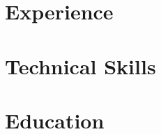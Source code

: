 \newcommand{\resumeSubSubheading}[2]{
    \item
    \begin{tabular*}{0.97\textwidth}{l@{\extracolsep{\fill}}r}
      \textit{\small#1} & \textit{\small #2} \\
    \end{tabular*}\vspace{-7pt}
}

\newcommand{\resumeProjectHeading}[2]{
    \item
    \begin{tabular*}{0.97\textwidth}{l@{\extracolsep{\fill}}r}
      \small#1 & #2 \\
    \end{tabular*}\vspace{-7pt}
}

\newcommand{\resumeSubItem}[1]{\resumeItem{#1}\vspace{-4pt}}

\renewcommand\labelitemii{$\vcenter{\hbox{\tiny$\bullet$}}$}

\newcommand{\resumeSubHeadingListStart}{\begin{itemize}[leftmargin=0.15in, label={}]}
\newcommand{\resumeSubHeadingListEnd}{\end{itemize}}
\newcommand{\resumeItemListStart}{\begin{itemize}[leftmargin=0.10in]}
\newcommand{\resumeItemListEnd}{\end{itemize}\vspace{-5pt}}





\vspace{3pt}
\small{
\parbox{0.97\textwidth}{
}
}
\vspace{-5pt}

\section{Experience}
  \resumeSubHeadingListStart
  \resumeSubHeadingListEnd

\section{Technical Skills}
 \begin{itemize}[leftmargin=0.15in, label={}]
 \end{itemize}

\section{Education}
  \resumeSubHeadingListStart
  \resumeSubHeadingListEnd


